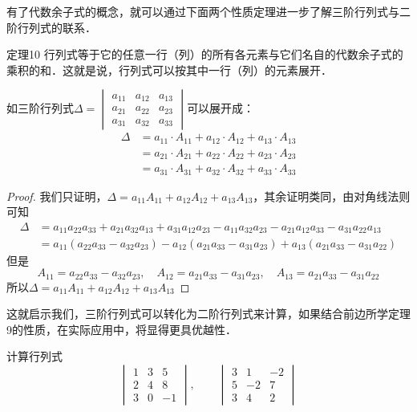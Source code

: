 有了代数余子式的概念，就可以通过下面两个性质定理进一步了解三阶行列式与二阶行列式的联系．

\begin{blk}{定理10}
    行列式等于它的任意一行（列）的所有各元素与它们名自的代数余子式的乘积的和．这就是说，行列式可以按其中一行（列）的元素展开．
    
    如三阶行列式$\Delta=\begin{vmatrix}
        a_{11}&a_{12}&a_{13}\\
        a_{21}&a_{22}&a_{23}\\
        a_{31}&a_{32}&a_{33}
    \end{vmatrix}$可以展开成：
\[\begin{split}
    \Delta &= a_{11}\cdot A_{11}+a_{12}\cdot A_{12}+a_{13}\cdot A_{13}\\
    &= a_{21}\cdot A_{21}+a_{22}\cdot A_{22}+a_{23}\cdot A_{23}\\
    &= a_{31}\cdot A_{31}
    +a_{32}\cdot A_{32}+a_{33}\cdot A_{33}
\end{split}\]
\end{blk}

\begin{proof}
我们只证明，$\Delta =a_{11}A_{11}+a_{12} A_{12}+a_{13} A_{13}$，其余证明类同，由对角线法则可知
\[\begin{split}
\Delta &=a_{11}a_{22}a_{33}+a_{21}a_{32}a_{13}+a_{31}a_{12}a_{23}-a_{11}a_{32}a_{23}-a_{21}a_{12}a_{33}-a_{31}a_{22}a_{13}\\
&=a_{11}(a_{22}a_{33}-a_{32}a_{23})-a_{12}(a_{21}a_{33}-a_{31}a_{23})+a_{13}(a_{21}a_{33}-a_{31}a_{22})
\end{split}\]
但是
\[A_{11}=a_{22}a_{33}-a_{32}a_{23},\quad A_{12}=a_{21}a_{33}-a_{31}a_{23},\quad A_{13}=a_{21}a_{33}-a_{31}a_{22}\]
所以$\Delta =a_{11}A_{11}+a_{12} A_{12}+a_{13} A_{13}$
\end{proof}

这就启示我们，三阶行列式可以转化为二阶行列式来计算，如果结合前边所学定理9的性质，在实际应用中，将显得更具优越性．

\begin{example}
    计算行列式
\[\begin{vmatrix}
    1&3&5\\2&4&8\\3&0&-1
\end{vmatrix},\qquad \begin{vmatrix}
    3&1&-2\\5&-2&7\\3&4&2
\end{vmatrix}\]
\end{example}



